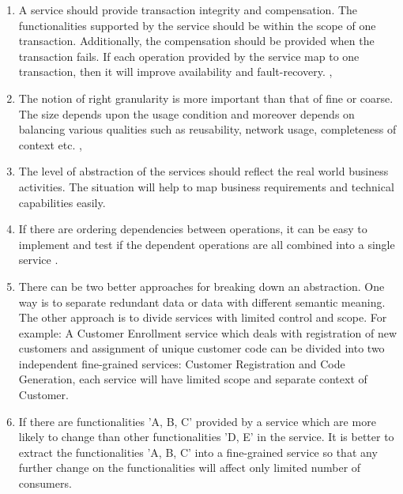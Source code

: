 \begin{enumerate}
\item A service should provide transaction integrity and compensation. The functionalities supported by the service should be within the scope of one transaction. Additionally, the compensation should be provided when the transaction fails. If each operation provided by the service map to one transaction, then it will improve availability and fault-recovery. \cite{Raf-Haesen:2015aa}, \cite{Foody:2005aa} \cite{Bianco:2007aa}

\item The notion of right granularity is more important than that of fine or coarse. The size depends upon the usage condition and moreover depends on balancing various qualities such as reusability, network usage, completeness of context etc. \cite{Raf-Haesen:2015aa}, \cite{Lawrence-Wilkes:2004aa}

\item The level of abstraction of the services should reflect the real world business activities. The situation will help to map business requirements and technical capabilities easily. \cite{Pierre-Reldin:2007aa}

\item If there are ordering dependencies between operations, it can be easy to implement and test if the dependent operations are all combined into a single service \cite{Bianco:2007aa}.

\item There can be two better approaches for breaking down an abstraction. One way is to separate redundant data or data with different semantic meaning. The other approach is to divide services with limited control and scope. For example: A Customer Enrollment service which deals with registration of new customers and assignment of unique customer code can be divided into two independent fine-grained services: Customer Registration and Code Generation, each service will have limited scope and separate context of Customer.\cite{Pierre-Reldin:2007aa}

\item If there are functionalities 'A, B, C' provided by a service which are more likely to change than other functionalities 'D, E' in the service. It is better to extract the functionalities 'A, B, C' into a fine-grained service so that any further change on the functionalities will affect only limited number of consumers. \cite{Bianco:2007aa}
 
\end{enumerate}

